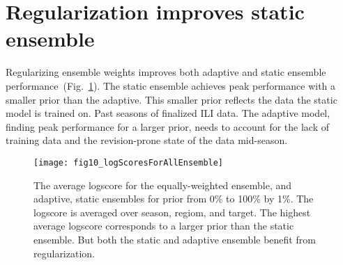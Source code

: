 \documentclass[12pt]{article}
\begin{document}
\section{Regularization improves static ensemble}

Regularizing ensemble weights improves both adaptive and static ensemble performance~(Fig.~\ref{fig.staticHelp}). 
The static ensemble achieves peak performance with a smaller prior than the adaptive.
This smaller prior reflects the data the static model is trained on. 
Past seasons of finalized ILI data. 
The adaptive model, finding peak performance for a larger prior, needs to account for the lack of training data and the revision-prone state of the data mid-season.

\graphicspath{{../_6_TLGs/_G/fig10_logScoresForAllEnsembles/}}
\begin{figure}
    \centering
    \texttt{[image: fig10\_logScoresForAllEnsemble]}
    \caption{The average logscore for the equally-weighted ensemble, and adaptive, static ensembles for prior from 0\% to 100\% by 1\%.
    The logscore is averaged over season, regiom, and target.
    The highest average logscore corresponds to a larger prior than the static ensemble. But both the static and adaptive ensemble benefit from regularization.\label{fig.staticHelp}}
\end{figure}



\end{document}
